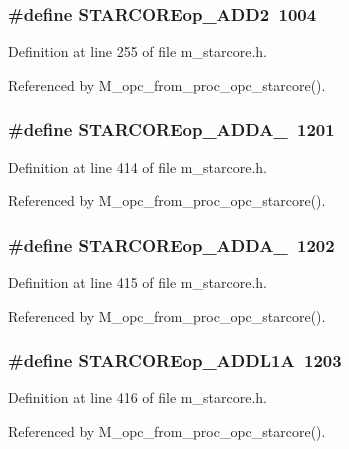 \subsubsection{\setlength{\rightskip}{0pt plus 5cm}\#define STARCOREop\_\-ADD2~1004}\label{m__starcore_8h_ab7dc8ae50e180bdbac9d8f74a8aeb9a}




Definition at line 255 of file m\_\-starcore.h.

Referenced by M\_\-opc\_\-from\_\-proc\_\-opc\_\-starcore().
\subsubsection{\setlength{\rightskip}{0pt plus 5cm}\#define STARCOREop\_\-ADDA\_~1201}\label{m__starcore_8h_65310671cc64eb354a02e4aade763828}




Definition at line 414 of file m\_\-starcore.h.

Referenced by M\_\-opc\_\-from\_\-proc\_\-opc\_\-starcore().
\subsubsection{\setlength{\rightskip}{0pt plus 5cm}\#define STARCOREop\_\-ADDA\_~1202}\label{m__starcore_8h_9465428d89e39ab04c2e646304d89447}




Definition at line 415 of file m\_\-starcore.h.

Referenced by M\_\-opc\_\-from\_\-proc\_\-opc\_\-starcore().
\subsubsection{\setlength{\rightskip}{0pt plus 5cm}\#define STARCOREop\_\-ADDL1A~1203}\label{m__starcore_8h_1f0279dabb08948c73675c25c4b28691}




Definition at line 416 of file m\_\-starcore.h.

Referenced by M\_\-opc\_\-from\_\-proc\_\-opc\_\-starcore().
